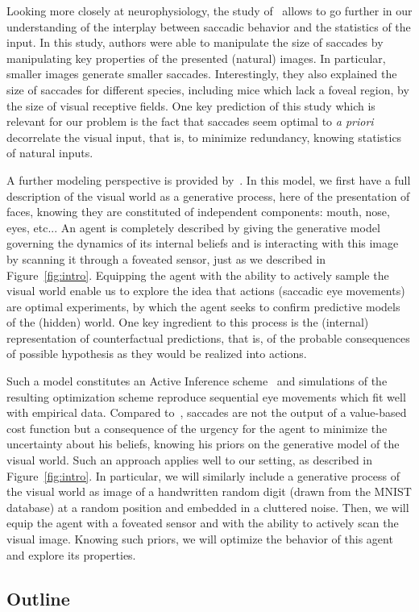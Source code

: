 Looking more closely at neurophysiology, the study of~\citep{Samonds18} allows to go further in our understanding of the interplay between saccadic behavior and the statistics of the input. In this study, authors were able to manipulate the size of saccades by manipulating key properties of the presented (natural) images. In particular, smaller images generate smaller saccades. Interestingly, they also explained the size of saccades for different species, including mice which lack a foveal region, by the size of visual receptive fields. One key prediction of this study which is relevant for our problem is the fact that saccades seem optimal to \emph{a priori} decorrelate the visual input, that is, to minimize redundancy, knowing statistics of natural inputs.

A further modeling perspective is provided by~\citep{Friston12}. In this model, we first have a full description of the visual world as a generative process, here of the presentation of faces, knowing they are constituted of independent components: mouth, nose, eyes, etc... An agent is completely described by giving the generative model governing the dynamics of its internal beliefs and is interacting with this image by scanning it through a foveated sensor, just as we described in Figure~\ref{fig:intro}. Equipping the agent with the ability to actively sample the visual world enable us to explore the idea that actions (saccadic eye movements) are optimal experiments, by which the agent seeks to confirm predictive models of the (hidden) world. One key ingredient to this process is the (internal) representation of counterfactual predictions, that is, of the probable consequences of possible hypothesis as they would be realized into actions.

Such a model constitutes an Active Inference scheme~\citep{Mirza18} and simulations of the resulting optimization scheme reproduce sequential eye movements which fit well with empirical data. Compared to~\citet{Najemnik05}, saccades are not the output of a value-based cost function but a consequence of the urgency for the agent to minimize the uncertainty about his beliefs, knowing his priors on the generative model of the visual world. Such an approach applies well to our setting, as described in Figure~\ref{fig:intro}. In particular, we will similarly include a generative process of the visual world as image of a handwritten random digit (drawn from the MNIST database) at a random position and embedded in a cluttered noise. Then, we will equip the agent with a foveated sensor and with the ability to actively scan the visual image. Knowing such priors, we will optimize the behavior of this agent and explore its properties.

\subsection{Outline}


